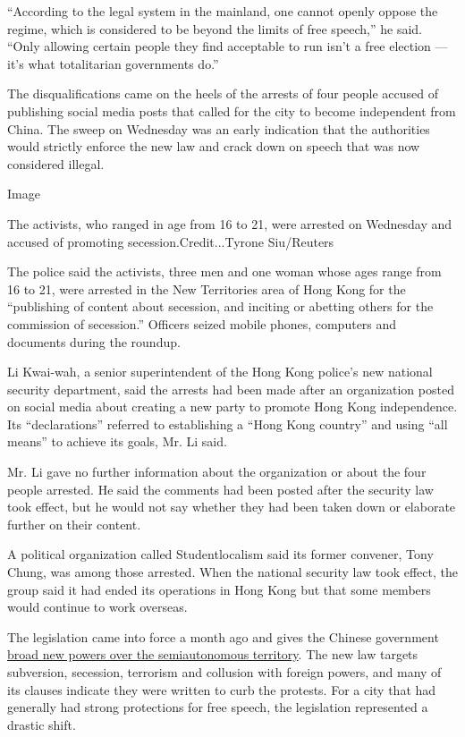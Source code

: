 ``According to the legal system in the mainland, one cannot openly
oppose the regime, which is considered to be beyond the limits of free
speech,'' he said. ``Only allowing certain people they find acceptable
to run isn't a free election --- it's what totalitarian governments
do.''

The disqualifications came on the heels of the arrests of four people
accused of publishing social media posts that called for the city to
become independent from China. The sweep on Wednesday was an early
indication that the authorities would strictly enforce the new law and
crack down on speech that was now considered illegal.

Image

The activists, who ranged in age from 16 to 21, were arrested on
Wednesday and accused of promoting secession.Credit...Tyrone Siu/Reuters

The police said the activists, three men and one woman whose ages range
from 16 to 21, were arrested in the New Territories area of Hong Kong
for the ``publishing of content about secession, and inciting or
abetting others for the commission of secession.'' Officers seized
mobile phones, computers and documents during the roundup.

Li Kwai-wah, a senior superintendent of the Hong Kong police's new
national security department, said the arrests had been made after an
organization posted on social media about creating a new party to
promote Hong Kong independence. Its ``declarations'' referred to
establishing a ``Hong Kong country'' and using ``all means'' to achieve
its goals, Mr. Li said.

Mr. Li gave no further information about the organization or about the
four people arrested. He said the comments had been posted after the
security law took effect, but he would not say whether they had been
taken down or elaborate further on their content.

A political organization called Studentlocalism said its former
convener, Tony Chung, was among those arrested. When the national
security law took effect, the group said it had ended its operations in
Hong Kong but that some members would continue to work overseas.

The legislation came into force a month ago and gives the Chinese
government
\href{https://www.nytimes3xbfgragh.onion/2020/06/29/world/asia/china-hong-kong-security-law-rules.html?searchResultPosition=6}{broad
new powers over the semiautonomous territory}. The new law targets
subversion, secession, terrorism and collusion with foreign powers, and
many of its clauses indicate they were written to curb the protests. For
a city that had generally had strong protections for free speech, the
legislation represented a drastic shift.

